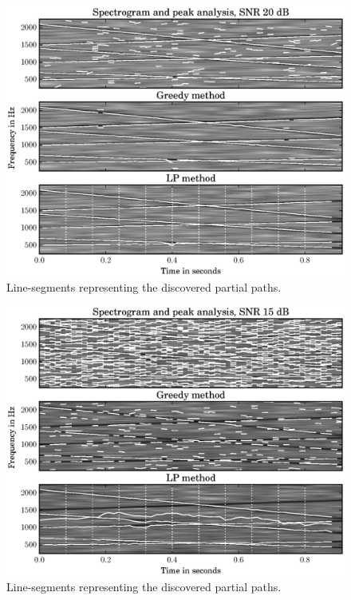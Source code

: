 \begin{figure}[!t]
    \centering
    \includegraphics[width=\figwidthscale\textwidth]{plots/mq_lp_compare_chirp_20.eps}
    \caption{ Line-segments representing the discovered partial paths.
    \label{plot:mq_lp_compare_chirp_20}}
\end{figure}
\begin{figure}[!t]
    \centering
    \includegraphics[width=\figwidthscale\textwidth]{plots/mq_lp_compare_chirp_15.eps}
    \caption{ Line-segments representing the discovered partial paths.
    \label{plot:mq_lp_compare_chirp_15}}
\end{figure}

